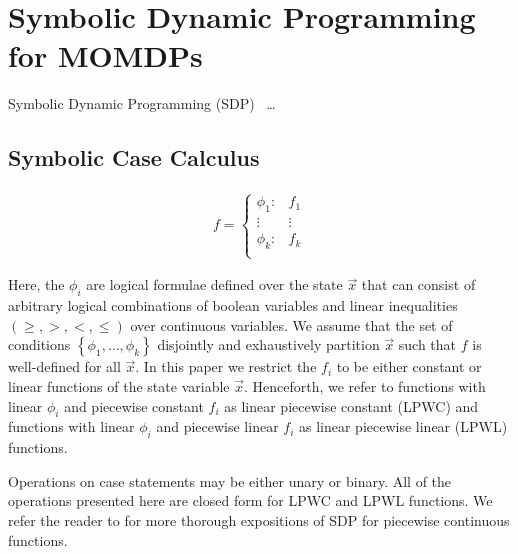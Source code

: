 \section{Symbolic Dynamic Programming for MOMDPs}
\label{sec:sdp}

Symbolic Dynamic Programming (SDP)~\parencite{Boutilier_IJCAI_2001} \ldots

\subsection{Symbolic Case Calculus}

{\footnotesize 
    \abovedisplayskip=5pt
    \belowdisplayskip=0pt
    \begin{align*}
        f = 
        \begin{cases}
            \phi_1: & f_1 \\ 
            \vdots & \vdots\\ 
            \phi_k: & f_k \\ 
        \end{cases}
    \end{align*}
}%

Here, the $\phi_i$ are logical formulae defined over the state $\vec{x}$ that can consist of arbitrary logical combinations of boolean variables and linear inequalities $\left( \geq, >, <, \leq \right)$ over continuous variables. We assume that the set of conditions $\left\lbrace \phi_1, \ldots, \phi_k \right\rbrace$
disjointly and exhaustively partition $\vec{x}$ such that $f$ is well-defined for all $\vec{x}$.  In this paper we restrict the $f_i$ to be either constant or linear functions of the state variable $\vec{x}$. Henceforth, we refer to functions with linear $\phi_i$ and piecewise constant $f_i$ as linear piecewise constant (LPWC) and functions with linear $\phi_i$ and piecewise linear $f_i$ as linear piecewise linear (LPWL) functions.

Operations on case statements may be either unary or binary. All of the operations presented here are closed form for LPWC and LPWL functions. We refer the reader to \parencite{Sanner_UAI_2011,Zamani_AAAI_2012} for more thorough expositions of SDP for piecewise continuous functions.

